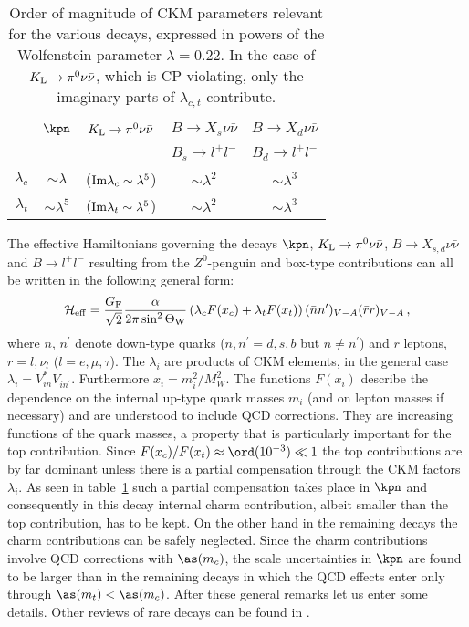 \begin{table}[htb]
\caption[]{
Order of magnitude of CKM parameters relevant for the various decays,
expressed in powers of the Wolfenstein parameter $\lambda=0.22$. In the
case of $K_{\rm L}\to\pi^0\nu\bar\nu$, which is CP-violating, only the
imaginary parts of $\lambda_{c, t}$ contribute.
\label{tab:lambdaexp}}
\begin{center}
\begin{tabular}{|r|c|c|c|c|}
\hline
&$\kpn$&$K_{\rm L}\to\pi^0\nu\bar\nu$&$B\to X_s\nu\bar\nu$&
$B\to X_d\nu\bar\nu$\\
&~&~&$B_s\to l^+l^-$&$B_d\to l^+l^-$\\  \hline
$\lambda_c$&$\sim\lambda$&(${\rm Im}\lambda_c\sim\lambda^5$)&
$\sim\lambda^2$&$\sim\lambda^3$\\  \hline
$\lambda_t$&$\sim\lambda^5$&(${\rm Im}\lambda_t\sim\lambda^5$)&
$\sim\lambda^2$&$\sim\lambda^3$ \\
\hline
\end{tabular}
\end{center}
\end{table}

The effective Hamiltonians governing the decays
$\kpn$, $K_{\rm L}\to\pi^0\nu\bar\nu$,
$B\to X_{s, d}\nu\bar\nu$ and $B\to l^+l^-$
resulting from the $Z^0$-penguin and box-type contributions can all be
written in the following general form:
\begin{equation}\label{hnr} 
{\cal H}_{\rm eff}={G_{\rm F} \over{\sqrt 2}}{\alpha\over 2\pi 
\sin^2\Theta_{\rm W}}
 \left( \lambda_c F(x_c) + \lambda_t F(x_t)\right)
 (\bar nn^\prime)_{V-A}(\bar rr)_{V-A}\,,  \end{equation}
where $n$, $n^\prime$ denote down-type quarks
($n, n^\prime=d, s, b$ but $n\not= n^\prime$) and $r$ leptons,
$r=l, \nu_l$ ($l=e, \mu, \tau$). The $\lambda_i$ are products of CKM elements,
in the general case $\lambda_i=V^*_{in}V_{in^\prime}^{}$. Furthermore
$x_i=m^2_i/M^2_W$.
The functions $F(x_i)$ describe the dependence on the internal
up-type quark masses $m_i$ (and on lepton masses if necessary)
and are understood to include QCD corrections.
They are increasing functions of the quark masses, a property that is
particularly important for the top contribution.
Since $F(x_c)/F(x_t)\approx
\ord(10^{-3})\ll 1$ the top contributions are by far dominant unless there
is a partial compensation through the CKM factors $\lambda_i$. 
 As seen in
table~\ref{tab:lambdaexp} such a partial compensation takes place in
$\kpn$  and consequently in this decay internal
charm contribution, albeit smaller than the top contribution,
has to be kept. On the other hand in the remaining decays the
charm contributions can be safely neglected. Since the charm contributions
involve QCD corrections with $\as(m_c)$, the scale uncertainties in 
$\kpn$  are found to be larger 
than in the remaining decays in which the QCD effects enter only
through $\as(m_t) < \as(m_c)$.
After these general remarks let us enter some details. Other reviews
of rare decays can be found in \cite{CPRARE,BF97}.

